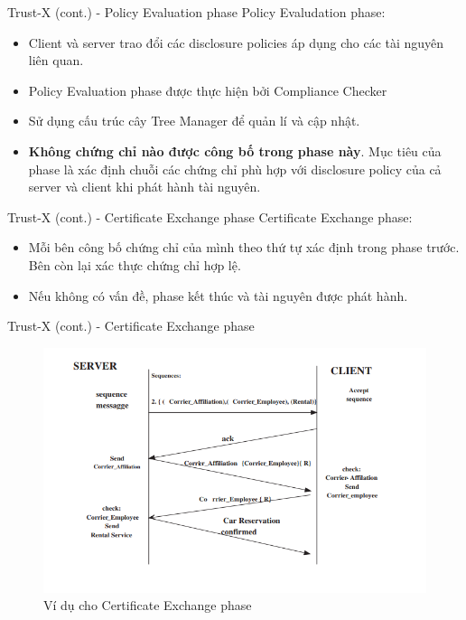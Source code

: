 \documentclass[11pt]{beamer}
\begin{document}
\begin{frame}{Trust-X (cont.) - Policy Evaluation phase}
Policy Evaludation phase:
\begin{itemize}
\item Client và server trao đổi các disclosure policies áp dụng cho các tài nguyên liên quan.
\item Policy Evaluation phase được thực hiện bởi Compliance Checker
\item Sử dụng cấu trúc cây Tree Manager để quản lí và cập nhật.
\item \textbf{Không chứng chỉ nào được công bố trong phase này}. Mục tiêu của phase là xác định chuỗi các chứng chỉ phù hợp với disclosure policy của cả server và client khi phát hành tài nguyên.
\end{itemize}
\end{frame}

\begin{frame}{Trust-X (cont.) - Certificate Exchange phase}
Certificate Exchange phase:
\begin{itemize}
\item Mỗi bên công bố chứng chỉ của mình theo thứ tự xác định trong phase trước. Bên còn lại xác thực chứng chỉ hợp lệ.
\item Nếu không có vấn đề, phase kết thúc và tài nguyên được phát hành.
\end{itemize}
\end{frame}

\begin{frame}{Trust-X (cont.) - Certificate Exchange phase}
\begin{figure}
\centering
\includegraphics[scale=.5]{img/cert-exchange.PNG}
\caption{Ví dụ cho Certificate Exchange phase}
\label{fig:cert-exchange}
\end{figure}
\end{frame}
\end{document}

